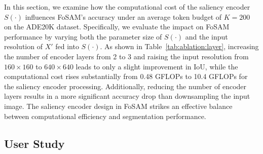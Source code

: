 \documentclass{article}
\begin{document}
\begin{table}
    \centering{}
\caption{Impact of the saliency encoder.}
\label{tab:ablation:layer}
\vspace{-10pt}
\end{table}
In this section, we examine how the computational cost of the saliency encoder $S(\cdot)$ influences FoSAM's accuracy under an average token budget of $K = 200$ on the ADE20K dataset. Specifically, we evaluate the impact on FoSAM performance by varying both the parameter size of $S(\cdot)$ and the input resolution of $X'$ fed into $S(\cdot)$.
As shown in Table~\ref{tab:ablation:layer}, increasing the number of encoder layers from 2 to 3 and raising the input resolution from $160 \times 160$ to $640 \times 640$ leads to only a slight improvement in IoU, while the computational cost rises substantially from 0.48 GFLOPs to 10.4 GFLOPs for the saliency encoder processing. Additionally, reducing the number of encoder layers results in a more significant accuracy drop than downsampling the input image. The saliency encoder design in FoSAM strikes an effective balance between computational efficiency and segmentation performance.

\subsection{User Study}
\label{sec:user-study}


\end{document}
